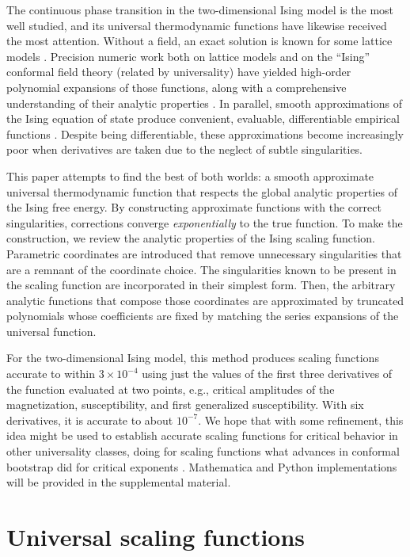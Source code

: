 \documentclass[
aps,
pre,
preprint,
longbibliography,
floatfix
]{revtex4-2}
\begin{document}
The continuous phase transition in the two-dimensional Ising model is the most
well studied, and its universal thermodynamic functions have likewise received
the most attention. Without a field, an exact solution is known for some
lattice models \cite{Onsager_1944_Crystal}. Precision numeric work both on
lattice models and on the ``Ising'' conformal field theory (related by
universality) have yielded high-order polynomial expansions of those functions,
along with a comprehensive understanding of their analytic properties
\cite{Fonseca_2003_Ising, Mangazeev_2008_Variational, Mangazeev_2010_Scaling}.
In parallel, smooth approximations of the Ising equation of state produce
convenient, evaluable, differentiable empirical functions
\cite{Caselle_2001_The}. Despite being differentiable, these approximations
become increasingly poor when derivatives are taken due to the neglect of
subtle singularities.

This paper attempts to find the best of both worlds: a smooth approximate
universal thermodynamic function that respects the global analytic properties
of the Ising free energy. By constructing approximate functions with the
correct singularities, corrections converge \emph{exponentially} to the true
function.  To make the construction, we review the analytic properties of the
Ising scaling function. Parametric coordinates are introduced that remove
unnecessary singularities that are a remnant of the coordinate choice. The
singularities known to be present in the scaling function are incorporated in
their simplest form. Then, the arbitrary analytic functions that compose those
coordinates are approximated by truncated polynomials whose coefficients are
fixed by matching the series expansions of the universal function.

For the two-dimensional Ising model, this method produces scaling functions
accurate to within $3\times 10^{-4}$ using just the values of the first three
derivatives of the function evaluated at two points, e.g., critical amplitudes
of the magnetization, susceptibility, and first generalized susceptibility.
With six derivatives, it is accurate to about $10^{-7}$. We hope that with some
refinement, this idea might be used to establish accurate scaling functions for
critical behavior in other universality classes, doing for scaling functions
what advances in conformal bootstrap did for critical exponents
\cite{Gliozzi_2014_Critical}. Mathematica and Python implementations will be provided in the supplemental material.

\section{Universal scaling functions}
\end{document}
